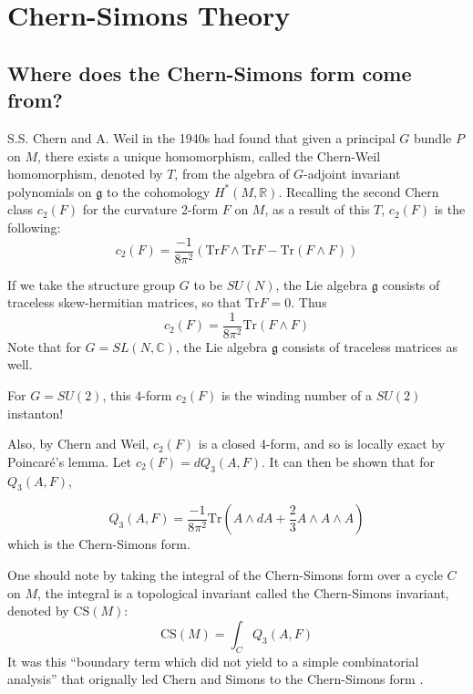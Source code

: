 \documentclass[a4paper,titlepage,twoside]{book}
\begin{document}
\section{Chern-Simons Theory }


\subsection{Where does the Chern-Simons form come from? }

S.S. Chern and A. Weil in the 1940s had found that given a principal $G$ bundle $P$ on $M$, there exists a unique homomorphism, called the Chern-Weil homomorphism, denoted by $T$, from the algebra of $G$-adjoint invariant polynomials on $\mathfrak{g}$ to the cohomology $H^*{( M, \mathbb{R})}$.  Recalling the second Chern class $c_2(F)$ for the curvature 2-form $F$ on $M$, as a result of this $T$, $c_2(F)$ is the following:
\[
c_2(F) = \frac{-1}{ 8\pi^2} \left( \text{Tr}{ F } \wedge \text{Tr}{ F} - \text{Tr}{ ( F \wedge F  ) } \right) 
\]

If we take the structure group $G$ to be $SU(N)$, the Lie algebra $\mathfrak{g}$ consists of traceless skew-hermitian matrices, so that $\text{Tr}{F} = 0$.  Thus
\[
c_2(F) = \frac{1}{ 8\pi^2} \text{Tr}{ ( F \wedge F) }
\]
Note that for $G = SL(N,\mathbb{C})$, the Lie algebra $\mathfrak{g}$ consists of traceless matrices as well.  

For $G=SU(2)$, this 4-form $c_2(F)$ is the winding number of a $SU(2)$ instanton!  

Also, by Chern and Weil, $c_2(F)$ is a closed 4-form, and so is locally exact by Poincar\'{e}'s lemma.  Let $c_2(F) = dQ_3(A,F)$.  It can then be shown that for $Q_3{ (A,F)}$, 



\begin{equation}
Q_3{ (A,F)} = \frac{-1}{ 8 \pi^2 } \text{Tr}{ \left( A \wedge dA + \frac{2}{3} A \wedge A \wedge A \right) }
\end{equation}
which is the Chern-Simons form.  

One should note by taking the integral of the Chern-Simons form over a cycle $C$ on $M$, the integral is a topological invariant called the Chern-Simons invariant, denoted by $\text{CS}{(M)}$:
\[
\text{CS}{(M)} = \int_C Q_3{ (A,F)}
\]
It was this ``boundary term which did not yield to a simple combinatorial analysis'' that orignally led Chern and Simons to the Chern-Simons form \cite{ChernSimons1974}.  
\end{document}
